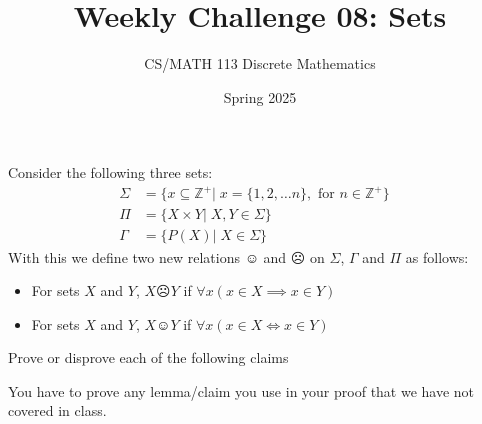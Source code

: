 \documentclass[a4paper]{exam}
\title{Weekly Challenge 08: Sets}
\author{CS/MATH 113 Discrete Mathematics}
\date{Spring 2025}
\begin{document}
\maketitle

\begin{questions}
    Consider the following three sets:
    \begin{align*}
        \Sigma & = \{x \subseteq \mathbb{Z}^+ |\; x = \{1, 2,  \dots n\}, \text{ for } n \in \mathbb{Z}^+\}&\\
        \Pi & = \{ X \times Y|\; X,Y \in \Sigma\}&\\
        \Gamma & = \{P(X)|\; X \in \Sigma\}
    \end{align*}
    With this we define two new relations $\smiley$ and $\frownie$ on $\Sigma$, $\Gamma$ and $\Pi$  as follows:  
    \begin{itemize}  
        \item For sets $X$ and $Y$, $X \frownie Y$ if $\forall x (x\in X \implies x\in Y)$  
        \item For sets $X$ and $Y$, $X \smiley Y$ if $\forall x (x\in X \iff x\in Y)$  
    \end{itemize} 

    Prove or disprove each of the following claims
    You have to prove any lemma/claim you use in your proof that we have not covered in class.

\end{questions}
\end{document}

